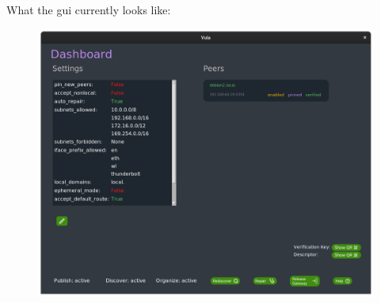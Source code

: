 \documentclass[
    type=projectproposal,
    twocolumn
]{bfhpub}
\begin{document}
 
\newpage

What the gui currently looks like:
\begin{figure}[ht]
    \centering
    \begin{minipage}{0.49\linewidth}
        \centering
        \includegraphics[width=\linewidth]{./../misc/frontend/dashboard.png}
    \end{minipage}\hfill
    \begin{minipage}{0.49\linewidth}
        \centering

\end{minipage}
\end{figure}
\end{document}

